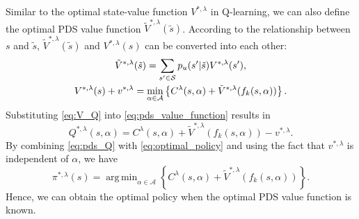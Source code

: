 \documentclass[lettersize, journal]{IEEEtran}
\newtheorem{theorem}{Theorem}
\DeclareMathOperator*{\argmin}{arg\,min}
\begin{document}
Similar to the optimal state-value function $V^{*, \lambda}$ in Q-learning,
we can also define the optimal PDS value function $\tilde{V}^{*, \lambda}(\tilde{s})$.
According to the relationship between $s$ and $\tilde{s}$, $\tilde{V}^{*, \lambda}(\tilde{s})$ and $V^{*, \lambda}(s)$ can be 
converted into each other:
\begin{gather}
    \tilde{V}^{*, \lambda}(\tilde{s}) = \sum_{s'\in\mathcal{S}} p_u(s'|\tilde{s}) V^{*, \lambda}(s'), \notag \\
    V^{*, \lambda}(s) + v^{*, \lambda} = \min_{\alpha\in\mathcal{A}} \left\{ C^{\lambda}(s, \alpha) + \tilde{V}^{*, \lambda}(f_k(s, \alpha)) \right\}. \label{eq:pds_value_function}
\end{gather}
Substituting \eqref{eq:V_Q} into \eqref{eq:pds_value_function} results in
\begin{equation}
    Q^{*,\lambda}(s,\alpha) = C^{\lambda}(s, \alpha) + \tilde{V}^{*, \lambda}(f_k(s, \alpha)) - v^{*,\lambda}.
    \label{eq:pds_Q}
\end{equation}
By combining \eqref{eq:pds_Q} with \eqref{eq:optimal_policy} and using the fact that $v^{*,\lambda}$ is independent of $\alpha$,
we have
\begin{equation*}
    {\pi}^{*,\lambda}(s) = \argmin_{\alpha\in\mathcal{A}} \left\{ C^{\lambda}(s, \alpha) + \tilde{V}^{*, \lambda}(f_k(s, \alpha)) \right\}.
\end{equation*}
Hence, we can obtain the optimal policy when the optimal PDS value function is known.
\end{document}

